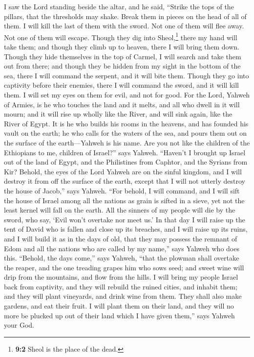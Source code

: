  I saw the Lord standing beside the altar, and he said,
``Strike the tops of the pillars, that the thresholds may shake. Break
them in pieces on the head of all of them. I will kill the last of them
with the sword. Not one of them will flee away. Not one of them will
escape.  Though they dig into Sheol,\footnote{\textbf{9:2}
  Sheol is the place of the dead.} there my hand will take them; and
though they climb up to heaven, there I will bring them down.
 Though they hide themselves in the top of Carmel, I will
search and take them out from there; and though they be hidden from my
sight in the bottom of the sea, there I will command the serpent, and it
will bite them.  Though they go into captivity before
their enemies, there I will command the sword, and it will kill them. I
will set my eyes on them for evil, and not for good.  For
the Lord, Yahweh of Armies, is he who touches the land and it melts, and
all who dwell in it will mourn; and it will rise up wholly like the
River, and will sink again, like the River of Egypt.  It
is he who builds his rooms in the heavens, and has founded his vault on
the earth; he who calls for the waters of the sea, and pours them out on
the surface of the earth---Yahweh is his name.  Are you
not like the children of the Ethiopians to me, children of Israel?''
says Yahweh. ``Haven't I brought up Israel out of the land of Egypt, and
the Philistines from Caphtor, and the Syrians from Kir? 
Behold, the eyes of the Lord Yahweh are on the sinful kingdom, and I
will destroy it from off the surface of the earth, except that I will
not utterly destroy the house of Jacob,'' says Yahweh. 
``For behold, I will command, and I will sift the house of Israel among
all the nations as grain is sifted in a sieve, yet not the least kernel
will fall on the earth.  All the sinners of my people
will die by the sword, who say, `Evil won't overtake nor meet us.'
 In that day I will raise up the tent of David who is
fallen and close up its breaches, and I will raise up its ruins, and I
will build it as in the days of old,  that they may
possess the remnant of Edom and all the nations who are called by my
name,'' says Yahweh who does this.  ``Behold, the days
come,'' says Yahweh, ``that the plowman shall overtake the reaper, and
the one treading grapes him who sows seed; and sweet wine will drip from
the mountains, and flow from the hills.  I will bring my
people Israel back from captivity, and they will rebuild the ruined
cities, and inhabit them; and they will plant vineyards, and drink wine
from them. They shall also make gardens, and eat their fruit.
 I will plant them on their land, and they will no more
be plucked up out of their land which I have given them,'' says Yahweh
your God.
